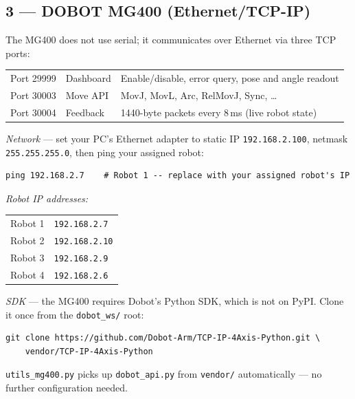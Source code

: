 \documentclass[11pt,a4paper]{article}
\begin{document}
\subsection*{3 --- DOBOT MG400 (Ethernet/TCP-IP)}

The MG400 does not use serial; it communicates over Ethernet via three TCP ports:

\begin{tabular}{lll}
  Port 29999 & Dashboard & Enable/disable, error query, pose and angle readout \\
  Port 30003 & Move API  & MovJ, MovL, Arc, RelMovJ, Sync, \ldots \\
  Port 30004 & Feedback  & 1440-byte packets every 8\,ms (live robot state) \\
\end{tabular}

\vspace{6pt}

\textit{Network} --- set your PC's Ethernet adapter to static IP \texttt{192.168.2.100},
netmask \texttt{255.255.255.0}, then ping your assigned robot:
\begin{lstlisting}[style=code]
ping 192.168.2.7    # Robot 1 -- replace with your assigned robot's IP
\end{lstlisting}

\textit{Robot IP addresses:}

\begin{tabular}{ll}
  Robot 1 & \texttt{192.168.2.7}  \\
  Robot 2 & \texttt{192.168.2.10} \\
  Robot 3 & \texttt{192.168.2.9}  \\
  Robot 4 & \texttt{192.168.2.6}  \\
\end{tabular}

\vspace{6pt}

\textit{SDK} --- the MG400 requires Dobot's Python SDK, which is not on PyPI.
Clone it once from the \texttt{dobot\_ws/} root:
\begin{lstlisting}[style=code]
git clone https://github.com/Dobot-Arm/TCP-IP-4Axis-Python.git \
    vendor/TCP-IP-4Axis-Python
\end{lstlisting}

\texttt{utils\_mg400.py} picks up \texttt{dobot\_api.py} from \texttt{vendor/}
automatically --- no further configuration needed.
\end{document}
